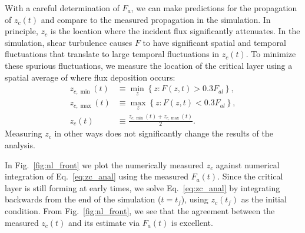 \documentclass[
        fleqn,
        usenatbib,
    ]{mnras}
\newcommand*{\z}[1]{\left\{#1\right\}}
\begin{document}
With a careful determination of $F_a$, we can make predictions for the
propagation of $z_c(t)$ and compare to the measured propagation in the
simulation. In principle, $z_c$ is the location where the incident flux
significantly attenuates. In the simulation, shear turbulence causes $F$ to have
significant spatial and temporal fluctuations that translate to large temporal
fluctuations in $z_c(t)$. To minimize these spurious fluctuations, we measure
the location of the critical layer using a spatial average of where flux
deposition occurs:
\begin{align}
    z_{c, \min}(t) &\equiv \min_z \z{z: F(z, t) > 0.3F_{al}},\\
    z_{c, \max}(t) &\equiv \max_z \z{z: F(z, t) < 0.3F_{al}},\\
    z_c(t) &\equiv \frac{z_{c, \min}(t) + z_{c, \max}(t)}{2}.\label{eq:zc_def}
\end{align}
Measuring $z_c$ in other ways does not significantly change the results of the
analysis.

In Fig.~\ref{fig:nl_front} we plot the numerically measured $z_c$ against
numerical integration of Eq.~\eqref{eq:zc_anal} using the measured $F_a(t)$.
Since the critical layer is still forming at early times, we solve
Eq.~\eqref{eq:zc_anal} by integrating backwards from the end of the simulation
($t = t_f$), using $z_c(t_f)$ as the initial condition. From
Fig.~\ref{fig:nl_front}, we see that the agreement between the measured $z_c(t)$
and its estimate via $F_a(t)$ is excellent.
\end{document}
